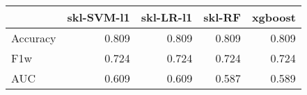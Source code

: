 \begin{tabular}{lrrrr}
\toprule
{} &  skl-SVM-l1 &  skl-LR-l1 &  skl-RF &  xgboost \\
\midrule
Accuracy &       0.809 &      0.809 &   0.809 &    0.809 \\
F1w      &       0.724 &      0.724 &   0.724 &    0.724 \\
AUC      &       0.609 &      0.609 &   0.587 &    0.589 \\
\bottomrule
\end{tabular}
